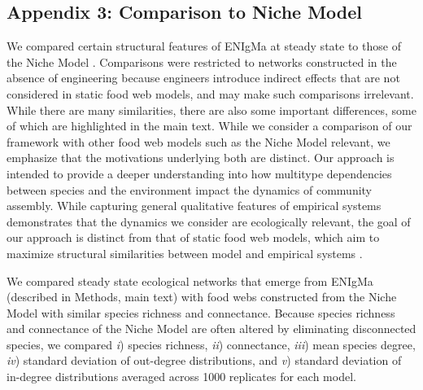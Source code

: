 \documentclass[twocolumn,preprintnumbers,amsmath,amssymb,superscriptaddress,linenumbers]{revtex4-1}
\begin{document}
\begin{bibunit}
\subsection*{Appendix 3: Comparison to Niche Model}
We compared certain structural features of ENIgMa at steady state to those of the Niche Model \cite{Williams2000}.
Comparisons were restricted to networks constructed in the absence of engineering because engineers introduce indirect effects that are not considered in static food web models, and may make such comparisons irrelevant.
While there are many similarities, there are also some important differences, some of which are highlighted in the main text.
While we consider a comparison of our framework with other food web models such as the Niche Model relevant, we emphasize that the motivations underlying both are distinct.
Our approach is intended to provide a deeper understanding into how multitype dependencies between species and the environment impact the dynamics of community assembly.
While capturing general qualitative features of empirical systems demonstrates that the dynamics we consider are ecologically relevant, the goal of our approach is distinct from that of static food web models, which aim to maximize structural similarities between model and empirical systems \cite{Williams2000,Williams2011}.

We compared steady state ecological networks that emerge from ENIgMa (described in Methods, main text) with food webs constructed from the Niche Model \cite{Williams2000} with similar species richness and connectance.
Because species richness and connectance of the Niche Model are often altered by eliminating disconnected species, we compared
\emph{i}) species richness,
\emph{ii}) connectance,
\emph{iii}) mean species degree,
\emph{iv}) standard deviation of out-degree distributions, and
\emph{v}) standard deviation of in-degree distributions
averaged across 1000 replicates for each model.


\end{bibunit}
\end{document}
